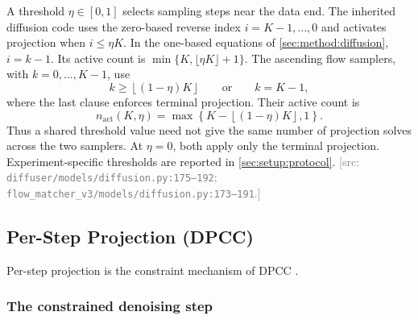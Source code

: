 \documentclass[headsepline,footsepline,footinclude=false,oneside,fontsize=11pt,paper=a4,listof=totoc,bibliography=totoc]{scrbook}
\theoremstyle{definition}
\theoremstyle{plain}
\theoremstyle{remark}
\newcommand{\sidx}[1]{_{\textrm{#1}}}
\newcommand{\nfe}{K}                           %
\newif\ifsubmission
\newcommand{\srcnote}[1]{\ifsubmission\else\textcolor{gray}{\footnotesize\textsf{[src: #1]}}\fi}
\begin{document}
A threshold $\eta\in[0,1]$ selects sampling steps near the data end. The inherited diffusion code
uses the zero-based reverse index $i=\nfe-1,\ldots,0$ and activates projection when
$i\le\eta\nfe$. In the one-based equations of \autoref{sec:method:diffusion}, $i=k-1$.
Its active count is $\min\{\nfe,\lfloor\eta\nfe\rfloor+1\}$.
The ascending flow samplers, with $k=0,\ldots,\nfe-1$, use
\begin{equation}\label{eq:method:proj:gate}
  k\ge\left\lfloor(1-\eta)\nfe\right\rfloor
  \qquad\text{or}\qquad k=\nfe-1,
\end{equation}
where the last clause enforces terminal projection. Their active count is
\begin{equation}\label{eq:method:proj:nact}
  n\sidx{act}(\nfe,\eta)
  =\max\!\left\{\nfe-\left\lfloor(1-\eta)\nfe\right\rfloor,1\right\}.
\end{equation}
Thus a shared threshold value need not give the same number of projection solves across the two
samplers. At $\eta=0$, both apply only the terminal projection. Experiment-specific thresholds are
reported in \autoref{sec:setup:protocol}.
\srcnote{\texttt{diffuser/models/diffusion.py:175--192};
\texttt{flow\_matcher\_v3/models/diffusion.py:173--191}.}

\subsection{Per-Step Projection (DPCC)}\label{sec:method:dpcc}

Per-step projection is the constraint mechanism of \ac{DPCC} \parencite{romer2025diffusion}.

\subsubsection*{The constrained denoising step}
\end{document}
